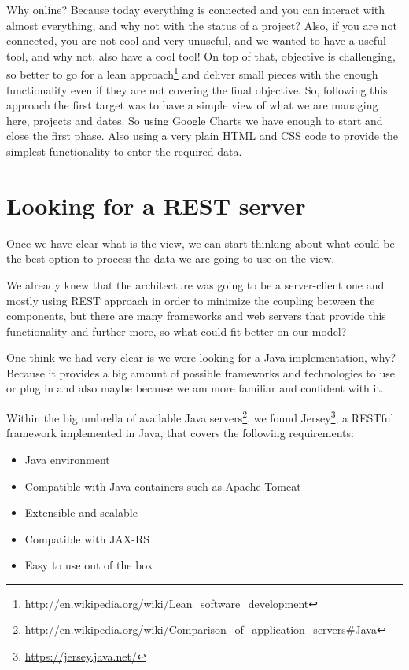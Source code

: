 Why online? Because today everything is connected and you can interact with
almost everything, and why not with the status of a project? Also, if you are
not connected, you are not cool and very unuseful, and we wanted to have a
useful tool, and why not, also have a cool tool!  On top of that, objective is
challenging, so better to go for a lean approach\footnote{\url{http://en.wikipedia.org/wiki/Lean\_software\_development}} and
deliver small pieces with the enough functionality even if they are not covering
the final objective. So, following this approach the first target was to have
a simple view of what we are managing here, projects and dates. So using Google
Charts we have enough to start and close the first phase. Also using a very
plain HTML and CSS code to provide the simplest functionality to enter the
required data.

\section{Looking for a REST server}
Once we have clear what is the view, we can start thinking about what could be
the best option to process the data we are going to use on the view.

We already knew that the architecture was going to be a server-client one and
mostly using REST approach in order to minimize the coupling between the
components, but there are many frameworks and web servers that provide this
functionality and further more, so what could fit better on our model?

One think we had very clear is we were looking for a Java implementation, why?
Because it provides a big amount of possible frameworks and technologies to
use or plug in and also maybe because we am more familiar and confident
with it.

Within the big umbrella of available Java servers\footnote{\url{http://en.wikipedia.org/wiki/Comparison\_of\_application\_servers\#Java}},
we found Jersey\footnote{\url{https://jersey.java.net/}}, a
RESTful framework implemented in Java, that covers the following
requirements:
\begin{itemize}
  \item Java environment
  \item Compatible with Java containers such as Apache Tomcat 
  \item Extensible and scalable
  \item Compatible with JAX-RS
  \item Easy to use out of the box
\end{itemize}


